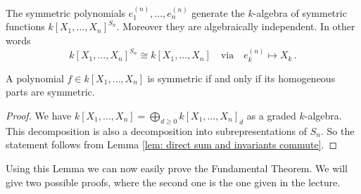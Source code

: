 \begin{thrm}
  The symmetric polynomials $e^{(n)}_1, \dotsc, e^{(n)}_n$ generate the $k$-algebra of symmetric functions $k[X_1, \dotsc, X_n]^{S_n}$.
  Moreover they are algebraically independent.
  In other words
  \[
            k[X_1, \dotsc, X_n]^{S_n}
    \cong   k[X_1, \dotsc, X_n]
    \quad\text{via}\quad
            e^{(n)}_k
    \mapsto X_k \,.
  \]
\end{thrm}


\begin{lem}
  A polynomial $f \in k[X_1, \dotsc, X_n]$ is symmetric if and only if its homogeneous parts are symmetric.
\end{lem}
\begin{proof}
  We have $k[X_1, \dotsc, X_n] = \bigoplus_{d \geq 0} k[X_1, \dotsc, X_n]_d$ as a graded $k$-algebra.
  This decomposition is also a decomposition into subrepresentations of $S_n$.
  So the statement follows from Lemma \ref{lem: direct sum and invariants commute}.
\end{proof}


Using this Lemma we can now easily prove the Fundamental Theorem.
We will give two possible proofs, where the second one is the one given in the lecture.


